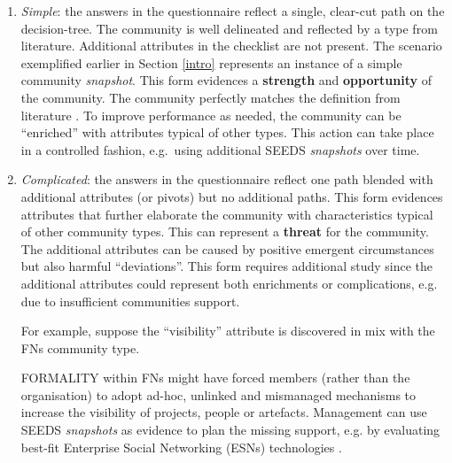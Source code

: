 \begin{enumerate}
\item \emph{Simple}: the answers in the questionnaire reflect a single, clear-cut path on the decision-tree. The community is well delineated and reflected by a type from literature. Additional attributes in the checklist are not present. The scenario exemplified earlier in Section \ref{intro} represents an instance of a simple community \emph{snapshot}. This form evidences a \textbf{strength} and \textbf{opportunity} of the community. The community perfectly matches the definition from literature \cite{ossslr}. To improve performance as needed, the community can be ``enriched'' with attributes typical of other types. This action can take place in a controlled fashion, e.g.~using additional SEEDS \emph{\emph{snapshots}} over time. 

\item \emph{Complicated}: the answers in the questionnaire reflect one path blended with additional attributes (or pivots) but no additional paths. This form evidences attributes that further elaborate the community with characteristics typical of other community types. This can represent a \textbf{threat} for the community. The additional attributes can be caused by positive emergent circumstances but also harmful ``deviations''. This form requires additional study since the additional attributes could represent both enrichments or complications, e.g. due to insufficient communities support.

For example, suppose the ``visibility'' attribute is discovered in mix with the FNs community type. 

FORMALITY within FNs might have forced members (rather than the organisation) to adopt ad-hoc, unlinked and mismanaged mechanisms to increase the visibility of projects, people or artefacts. Management can use SEEDS \emph{snapshots} as evidence to plan the missing support, e.g. by evaluating best-fit Enterprise Social Networking (ESNs) technologies \cite{eis,eim}.


\end{enumerate}
